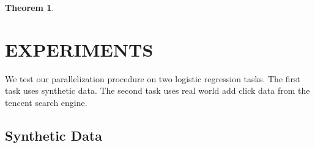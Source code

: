 \documentclass[twoside]{article}
\newtheorem{theorem}{Theorem}
\newtheorem{lemma}{Lemma}
\newcommand{\Wave}{{\mathcal{\hat W}^{ave}}}
\newcommand{\w}{\theta}
\newcommand{\wmle}{\hat\w^{mle}}
\newcommand{\wstar}{{\w^{*}}}
\newcommand{\ltwo}[1]{{\lVert {#1} \rVert}}
\newcommand{\proj}[1]{\pi_{{#1}}}
\newcommand{\ignore}[1]{}
\begin{document}
{\begin{theorem}

\end{theorem}

\ignore{
\subsection{Overall growth}

In this section we assume the following regularity conditions.

\begin{theorem}
Assume conditions (1-5) above hold.
Then in the limit as $n$ approaches $\infty$:
\begin{enumerate}
\item
If $f$ is locally $\sigma$-strongly convex around $\wstar$
\begin{equation}
\Pr{a}
\end{equation}
\item
If $f$ is locally $\ell$-Lipschitz around $\wstar$
(i.e. ),
then
\begin{equation}
\end{equation}
\end{enumerate}
\end{theorem}

\begin{lemma}
\label{lem:normaff}
Let $W : \mathbb{R}^{d\times m}$ be a random matrix where each entry is distributed as a standard Gaussian.
Let $\Wave$ be the affine hull of the columns of $W$;
that is,
\begin{equation}
\Wave = \left\{\sum_{i=1}^m c_i\wmle_i : c\in\mathbb{R}, \sum_{i=1}^m c_i = 1 \right\}
\end{equation}
Then for all $t$,
\begin{equation}
\Pr\left[\ltwo{\proj{W}0}^2 > O(t(1-m/d))\right] \le 1 - \exp(-t)
\end{equation}
\end{lemma}
}
}

\section{EXPERIMENTS}
\label{sec:exp}

We test our parallelization procedure on two logistic regression tasks.
The first task uses synthetic data.
The second task uses real world add click data from the tencent search engine.

\subsection{Synthetic Data}
\end{document}
